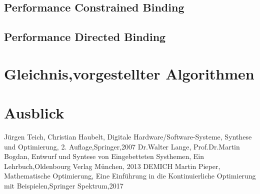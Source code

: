 \documentclass[conference]{IEEEtran}
\begin{document}
\subsection{Performance Constrained Binding}
\subsection{Performance Directed Binding}
\section{Gleichnis,vorgestellter Algorithmen}
\section{Ausblick}

\begin{thebibliography}{00}
 Jürgen Teich, Christian Haubelt, Digitale Hardware/Software-Systeme, Synthese und Optimierung, 2. Auflage,Springer,2007
 Dr.Walter Lange, Prof.Dr.Martin Bogdan, Entwurf und Syntese von Eingebetteten Systhemen, Ein Lehrbuch,Oldenbourg Verlag München, 2013
 DEMICH
 Martin Pieper, Mathematische Optimierung, Eine Einführung in die Kontinuierliche Optimierung mit Beispielen,Springer Spektrum,2017
\end{thebibliography}
\listoffigures
\listoftables
\vspace{12pt}
\end{document}
